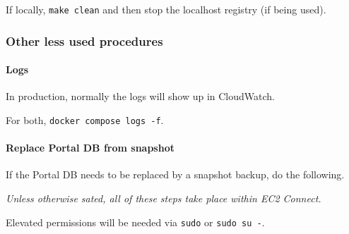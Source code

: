 If locally, \texttt{make clean} and then stop the localhost registry (if being used).

\subsubsection{Other less used procedures}

\paragraph{Logs}

In production, normally the logs will show up in CloudWatch.

For both, \texttt{docker compose logs -f}.

\paragraph{Replace Portal DB from snapshot}

If the Portal DB needs to be replaced by a snapshot backup, do the following.

\textit{Unless otherwise sated, all of these steps take place within EC2 Connect.}

Elevated permissions will be needed via \texttt{sudo} or \texttt{sudo su -}.


